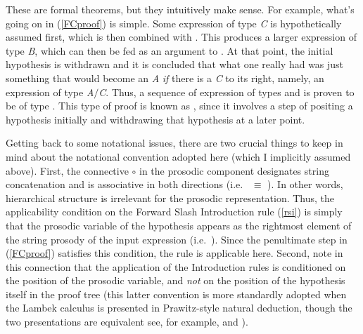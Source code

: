 \documentclass[output=paper
                ,modfonts
 	        ,biblatex
                ,babelshorthands
                ,newtxmath
                ,draftmode
                ,colorlinks, citecolor=brown
]{langscibook}
\begin{document}
\noindent
These are formal theorems, but they intuitively make sense.
For example, what's going on in  (\ref{FCproof}) is simple. 
Some expression of type  \textit{C} is 
hypothetically assumed first, which is then combined with
. This produces a larger expression
of type \textit{B}, which can then be fed as an argument to
. 
At that point, the initial hypothesis is withdrawn and it is concluded
that what one really had was just something that would become an \textit{A} \emph{if}
there is a \textit{C} to its right, namely, an expression of type \textit{A}\ensuremath{/}\textit{C}.
Thus, a sequence of expression of types  and 
is proven to be of type .  This type of proof
is known as , since it involves a step of
positing a hypothesis initially and withdrawing that hypothesis
at a later point.

Getting back to some notational issues, there are two crucial things
to keep in mind about the notational 
convention adopted here (which I implicitly assumed above). First, the
connective \ensuremath{\circ}\xspace in the prosodic component designates string
concatenation and is associative in both directions
(i.e.\  \pt{ (\ensuremath{\greekp_1} \ensuremath{\circ}\xspace \ensuremath{\greekp_2}) \ensuremath{\circ}\xspace \ensuremath{\greekp_3}} \ensuremath{ \equiv\xspace } \pt{ \ensuremath{\greekp_1} \ensuremath{\circ}\xspace (\ensuremath{\greekp_2} \ensuremath{\circ}\xspace \ensuremath{\greekp_3}) }). In other words, hierarchical
structure is irrelevant for the prosodic representation. Thus,
the applicability condition on the Forward Slash
Introduction rule (\ref{rsi}) is simply that
the prosodic variable \pt{ \ensuremath{\greekp} }
of the hypothesis appears as the rightmost element of the
string prosody of the input expression (i.e.\
\pt{\ptv{b} \ensuremath{\circ}\xspace \ensuremath{\greekp} }).
Since the penultimate step in (\ref{FCproof}) satisfies this 
condition, the rule is applicable here. Second, note in this
connection that the application of the
Introduction rules is conditioned on the position of the prosodic
variable, and \emph{not} on the position of the hypothesis itself in the
proof tree (this latter convention is more standardly adopted when the
Lambek calculus is presented in Prawitz-style natural deduction,
though the two presentations are
equivalent \emdashUS see, for example, \citealt[Chapter~5]{Carpenter98a-u} and
\citealt[Chapter~1]{jaeger05}).
\end{document}
